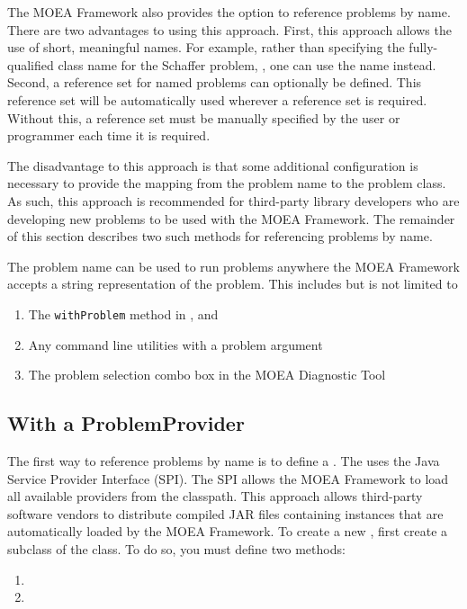 The MOEA Framework also provides the option to reference problems by name.  There are two advantages to using this approach.  First, this approach allows the use of short, meaningful names.  For example, rather than specifying the fully-qualified class name for the Schaffer problem, , one can use the name  instead.  Second, a reference set for named problems can optionally be defined.  This reference set will be automatically used wherever a reference set is required.  Without this, a reference set must be manually specified by the user or programmer each time it is required.

The disadvantage to this approach is that some additional configuration is necessary to provide the mapping from the problem name to the problem class.  As such, this approach is recommended for third-party library developers who are developing new problems to be used with the MOEA Framework.  The remainder of this section describes two such methods for referencing problems by name.

The problem name can be used to run problems anywhere the MOEA Framework accepts a string representation of the problem.  This includes but is not limited to
\begin{enumerate}
  \item The \texttt{withProblem} method in ,  and 
  \item Any command line utilities with a problem argument
  \item The problem selection combo box in the MOEA Diagnostic Tool
\end{enumerate}

\subsection{With a ProblemProvider}
The first way to reference problems by name is to define a .  The  uses the Java Service Provider Interface (SPI).  The SPI allows the MOEA Framework to load all available providers from the classpath.  This approach allows third-party software vendors to distribute compiled JAR files containing  instances that are automatically loaded by the MOEA Framework.  To create a new , first create a subclass of the  class.  To do so, you must define two methods:
\begin{enumerate}
  \item {}
  \item {}
\end{enumerate}


